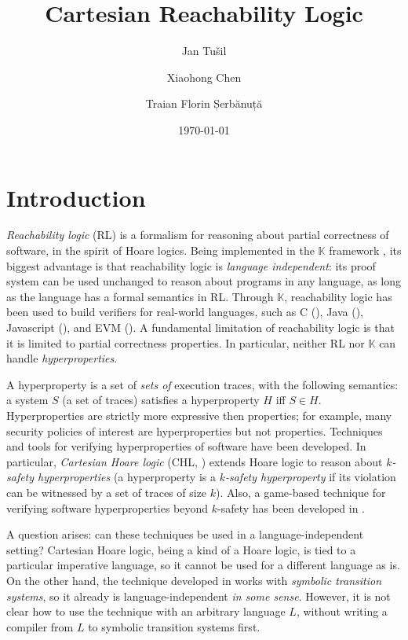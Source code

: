 \documentclass{article}
\title{Cartesian Reachability Logic}
\author{Jan Tu\v{s}il \and Xiaohong Chen \and Traian Florin Șerbănuță
}
\date{\today}
\newcommand{\K}{$\mathbb{K}$}
\begin{document}
\maketitle

\section{Introduction}

\emph{Reachability logic} (RL) \cite{RosuS12oopsla,RosuSCM13lics,StefanescuCMMSR19}
is a
formalism for reasoning about partial correctness of software, in the spirit of Hoare logics.
Being implemented in the \K{} framework \cite{KVision},
its biggest advantage is that reachability logic is \emph{language independent}:
its proof system can be used unchanged to reason about programs in any language,
as long as the language has a formal semantics in RL.
Through \K{}, reachability logic has been used to build verifiers for real-world languages,
such as C (\cite{RVMatch}), Java (\cite{StefanescuPYLR16VerifiersForAll}), Javascript (\cite{StefanescuPYLR16VerifiersForAll}),
and EVM (\cite{KevmVerificationTool}).
A fundamental limitation of reachability logic is that it is limited to partial correctness properties.
In particular, neither RL nor \K{} can handle \emph{hyperproperties}.

A hyperproperty is a set of \emph{sets of} execution traces, with the following semantics:
a system $S$ (a set of traces) satisfies a hyperproperty $H$ iff $S \in H$.
Hyperproperties are strictly more expressive then properties; for example, many security policies
of interest are hyperproperties but not properties.
Techniques and tools for verifying hyperproperties of software have been developed.
In particular, \emph{Cartesian Hoare logic} (CHL, \cite{SousaD16}) extends Hoare logic
to reason about \emph{$k$-safety hyperproperties}
(a hyperproperty is a \emph{$k$-safety hyperproperty} if its violation can be witnessed
by a set of traces of size $k$).
Also, a game-based technique for verifying software hyperproperties beyond $k$-safety
has been developed in \cite{BeutnerF22}.

A question arises: can these techniques be used in a language-independent setting?
Cartesian Hoare logic, being a kind of a Hoare logic, is tied to a particular imperative language,
so it cannot be used for a different language as is.
On the other hand, the technique developed in \cite{BeutnerF22} works with \emph{symbolic transition systems},
so it already is language-independent \emph{in some sense}. However, it is not clear how to use the technique
with an arbitrary language $L$, without writing a compiler from $L$ to symbolic transition systems first.
\end{document}

